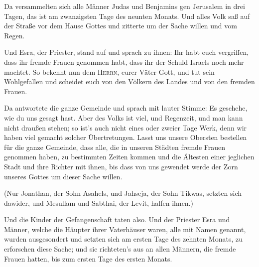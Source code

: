  Da versammelten sich alle Männer Judas und Benjamins gen
Jerusalem in drei Tagen, das ist am zwanzigsten Tage des neunten Monats.
Und alles Volk saß auf der Straße vor dem Hause Gottes und zitterte um
der Sache willen und vom Regen.

 Und Esra, der Priester, stand auf und sprach zu ihnen:
Ihr habt euch vergriffen, dass ihr fremde Frauen genommen habt, dass ihr
der Schuld Israels noch mehr machtet.  So bekennt nun dem
\textsc{Herrn}, eurer Väter Gott, und tut sein Wohlgefallen und scheidet
euch von den Völkern des Landes und von den fremden Frauen.

 Da antwortete die ganze Gemeinde und sprach mit lauter
Stimme: Es geschehe, wie du uns gesagt hast.  Aber des
Volks ist viel, und Regenzeit, und man kann nicht draußen stehen; so
ist's auch nicht eines oder zweier Tage Werk, denn wir haben viel
gemacht solcher Übertretungen.  Lasst uns unsere Obersten
bestellen für die ganze Gemeinde, dass alle, die in unseren Städten
fremde Frauen genommen haben, zu bestimmten Zeiten kommen und die
Ältesten einer jeglichen Stadt und ihre Richter mit ihnen, bis dass von
uns gewendet werde der Zorn unseres Gottes um dieser Sache willen.

 (Nur Jonathan, der Sohn Asahels, und Jahseja, der Sohn
Tikwas, setzten sich dawider, und Mesullam und Sabthai, der Levit,
halfen ihnen.)

 Und die Kinder der Gefangenschaft taten also. Und der
Priester Esra und Männer, welche die Häupter ihrer Vaterhäuser waren,
alle mit Namen genannt, wurden ausgesondert und setzten sich am ersten
Tage des zehnten Monats, zu erforschen diese Sache;  und
sie richteten's aus an allen Männern, die fremde Frauen hatten, bis zum
ersten Tage des ersten Monats.

